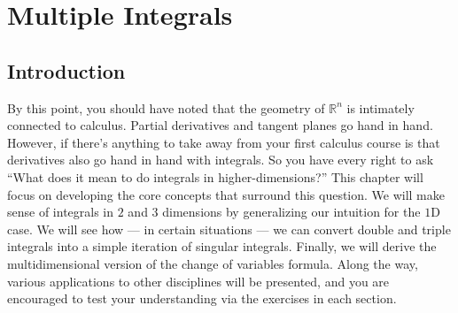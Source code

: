 \chapter{Multiple Integrals}
\setcounter{exercisecounter}{0}

\setcounter{thmcounter}{1}
\section{Introduction}

By this point, you should have noted that the geometry of $\mathbb{R}^n$ is intimately connected to calculus. Partial derivatives and tangent planes go hand in hand. However, if there's anything to take away from your first calculus course is that derivatives also go hand in hand with integrals. So you have every right to ask ``What does it mean to do integrals in higher-dimensions?'' This chapter will focus on developing the core concepts that surround this question. We will make sense of integrals in $2$ and $3$ dimensions by generalizing our intuition for the $1\text{D}$ case. We will see how --- in certain situations --- we can convert double and triple integrals into a simple iteration of singular integrals. Finally, we will derive the multidimensional version of the change of variables formula. Along the way, various applications to other disciplines will be presented, and you are encouraged to test your understanding via the exercises in each section. 


